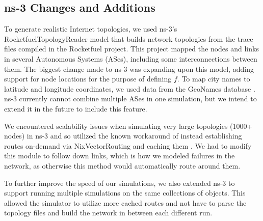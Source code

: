 \documentclass[conference]{IEEEtran}
\begin{document}
\subsection{ns-3 Changes and Additions}

To generate realistic Internet topologies, we used ns-3's RocketfuelTopologyReader model that builds network topologies from the trace files compiled in the Rocketfuel \cite{rocketfuel} project.
This project mapped the nodes and links in several Autonomous Systems (ASes), including some interconnections between them.
The biggest change made to ns-3 was expanding upon this model, adding support for node locations for the purpose of defining $f$.
To map city names to latitude and longitude coordinates, we used data from the GeoNames database \cite{geonames}.
ns-3 currently cannot combine multiple ASes in one simulation, but we intend to extend it in the future to include this feature.

We encountered scalability issues when simulating very large topologies (1000+ nodes) in ns-3 and so utilized the known workaround of instead establishing routes on-demand via NixVectorRouting and caching them \cite{ns3_routing_bug}.
We had to modify this module to follow down links, which is how we modeled failures in the network, as otherwise this method would automatically route around them.

To further improve the speed of our simulations, we also extended ns-3 to support running multiple simulations on the same collections of objects.
This allowed the simulator to utilize more cached routes and not have to parse the topology files and build the network in between each different run.

\end{document}
